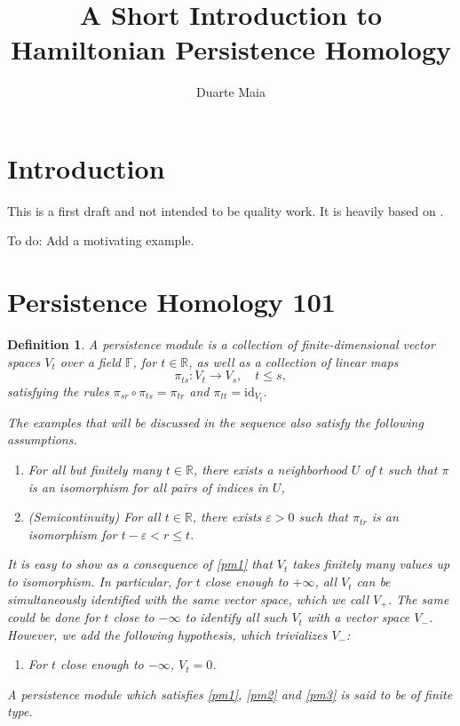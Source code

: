 \documentclass{article}
\title{A Short Introduction to Hamiltonian Persistence Homology}
\author{Duarte Maia}
\newtheorem{definition}{Definition}
\theoremstyle{nonumberplain}
\newcommand{\R}{\mathbb{R}}
\newcommand{\FF}{\mathbb{F}} %
\newcommand{\id}{\mathrm{id}}
\begin{document}
\maketitle

\pagebreak

\tableofcontents

\pagebreak

\section{Introduction}

This is a first draft and not intended to be quality work. It is heavily based on \cite{polterovich}.

To do: Add a motivating example.

\section{Persistence Homology 101}

\begin{definition}
A \emph{persistence module} is a collection of finite-dimensional vector spaces $V_t$ over a field $\FF$, for $t \in \R$, as well as a collection of linear maps
\begin{equation}
\pi_{ts} \colon V_t \to V_s, \quad t\leq s,
\end{equation}
satisfying the rules $\pi_{sr} \circ \pi_{ts} = \pi_{tr}$ and $\pi_{tt} = \id_{V_t}$.

The examples that will be discussed in the sequence also satisfy the following assumptions.

\begin{enumerate}[label=\roman*)]
\item\label{pm1} For all but finitely many $t \in \R$, there exists a neighborhood $U$ of $t$ such that $\pi$ is an isomorphism for all pairs of indices in $U$,
\item\label{pm2} \textit{(Semicontinuity)} For all $t \in \R$, there exists $\varepsilon > 0$ such that $\pi_{tr}$ is an isomorphism for $t-\varepsilon < r \leq t$.
\end{enumerate}

It is easy to show as a consequence of \ref{pm1} that $V_t$ takes finitely many values up to isomorphism. In particular, for $t$ close enough to $+\infty$, all $V_t$ can be simultaneously identified with the same vector space, which we call $V_+$. The same could be done for $t$ close to $-\infty$ to identify all such $V_t$ with a vector space $V_-$. However, we add the following hypothesis, which trivializes $V_-$:

\begin{enumerate}[resume*]
\item\label{pm3} For $t$ close enough to $-\infty$, $V_t = 0$.
\end{enumerate}

A persistence module which satisfies \ref{pm1}, \ref{pm2} and \ref{pm3} is said to be \emph{of finite type}.
\end{definition}
\end{document}
